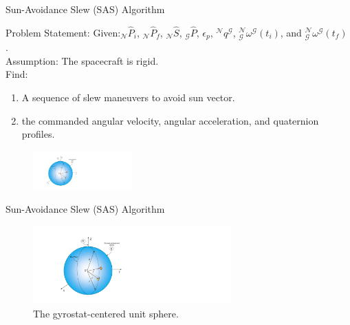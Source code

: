 \documentclass{beamer}
\begin{document}
\begin{frame}{Sun-Avoidance Slew (SAS) Algorithm}
	\begin{block}{Problem Statement:}
		Given:$_\mathcal{N}\hat{P}_i$, $_\mathcal{N}\hat{P}_f$, $_\mathcal{N}\hat{S}$, $_\mathcal{G}\hat{P}$, $\epsilon_p$, $^\mathcal{N}q^\mathcal{G}$, $^\mathcal{N}_\mathcal{G}\omega^\mathcal{G}(t_i)$, and $^\mathcal{N}_\mathcal{G}\omega^\mathcal{G}(t_f)$ .\\
		Assumption: The spacecraft is rigid.\\
		Find: 
		\begin{enumerate}
			\item A sequence of slew maneuvers to avoid sun vector.
			\item the commanded angular velocity, angular acceleration, and quaternion profiles.
		\end{enumerate} 
		\begin{figure}
			\includegraphics[width=1.5in]{./Figures/SASSchematic1}
		\end{figure}
	\end{block}
\end{frame}
\begin{frame}{Sun-Avoidance Slew (SAS) Algorithm}
	\begin{block}{}
	\begin{figure}
	\includegraphics[width=3in]{./Figures/SASSchematic1}
	\caption{The gyrostat-centered unit sphere.}
	\end{figure}
	\end{block}
\end{frame}
\end{document}
